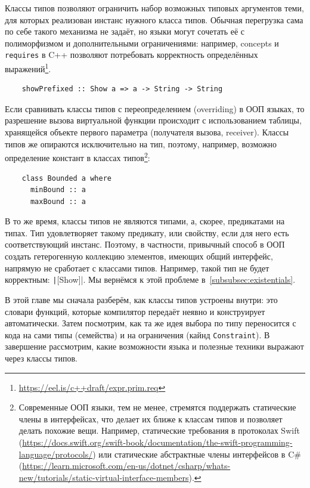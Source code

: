 Классы типов позволяют ограничить набор возможных типовых аргументов теми, для которых реализован инстанс нужного класса типов.
Обычная перегрузка сама по себе такого механизма не задаёт, но языки могут сочетать её с полиморфизмом и дополнительными ограничениями: например, concepts и \texttt{requires} в C++ позволяют потребовать корректность определённых выражений\footnote{\url{https://eel.is/c++draft/expr.prim.req}}.
\begin{verbatim}
    showPrefixed :: Show a => a -> String -> String
\end{verbatim}

Если сравнивать классы типов с переопределением (overriding) в ООП языках, то разрешение вызова виртуальной функции происходит с использованием таблицы, хранящейся объекте первого параметра (получателя вызова, receiver).
Классы типов же опираются исключительно на тип, поэтому, например, возможно определение констант в классах типов\footnote{Современные ООП языки, тем не менее, стремятся поддержать статические члены в интерфейсах, что делает их ближе к классам типов и позволяет делать похожие вещи. Например, статические требования в протоколах Swift (\url{https://docs.swift.org/swift-book/documentation/the-swift-programming-language/protocols/}) или статические абстрактные члены интерфейсов в C\# (\url{https://learn.microsoft.com/en-us/dotnet/csharp/whats-new/tutorials/static-virtual-interface-members}).}:
\begin{verbatim}
    class Bounded a where
      minBound :: a
      maxBound :: a
\end{verbatim}

В то же время, классы типов не являются типами, а, скорее, предикатами на типах.
Тип удовлетворяет такому предикату, или свойству, если для него есть соответствующий инстанс.
Поэтому, в частности, привычный способ в ООП создать гетерогенную коллекцию элементов, имеющих общий интерфейс, напрямую не сработает с классами типов.
Например, такой тип не будет корректным: \texttt|[Show]|.
Мы вернёмся к этой проблеме в~\ref{subsubsec:existentials}.

В этой главе мы сначала разберём, как классы типов устроены внутри: это словари функций, которые компилятор передаёт неявно и конструирует автоматически.
Затем посмотрим, как та же идея выбора по типу переносится с кода на сами типы (семейства) и на ограничения (кайнд \texttt{Constraint}).
В завершение рассмотрим, какие возможности языка и полезные техники выражают через классы типов.

